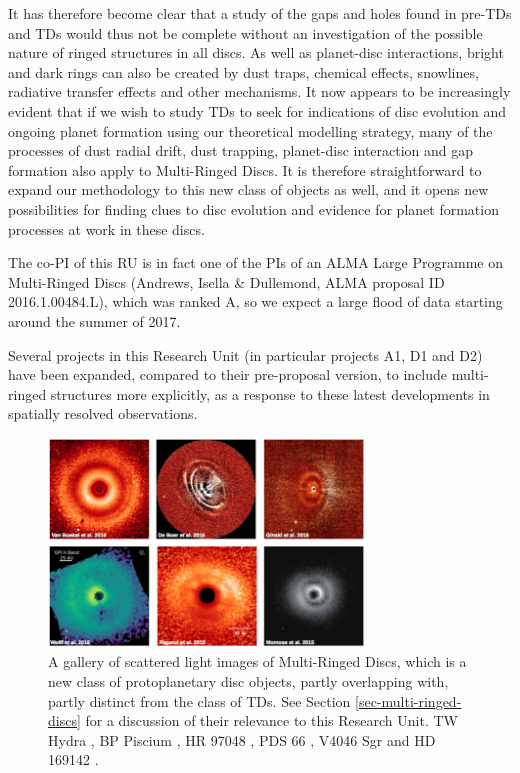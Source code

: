 \documentclass[10pt,fleqn,twoside]{article}
\begin{document}
It has therefore become clear that a study of the gaps and holes found in
pre-TDs and TDs would thus not be complete without an investigation of the
possible nature of ringed structures in all discs. As well as planet-disc
interactions, bright and dark rings can also be created by dust traps,
chemical effects, snowlines, radiative transfer effects and other
mechanisms. It now appears to be increasingly evident that if we wish to
study TDs to seek for indications of disc evolution and ongoing planet
formation using our theoretical modelling strategy, many of the processes of
dust radial drift, dust trapping, planet-disc interaction and gap formation
also apply to Multi-Ringed Discs. It is therefore straightforward to expand
our methodology to this new class of objects as well, and it opens new
possibilities for finding clues to disc evolution and evidence for planet
formation processes at work in these discs.

The co-PI of this RU is in fact one of the PIs of an ALMA Large Programme on
Multi-Ringed Discs (Andrews, Isella \& Dullemond, ALMA proposal ID
2016.1.00484.L), which was ranked A, so we expect a large flood of data
starting around the summer of 2017. 

Several projects in this Research Unit (in particular projects A1, D1 and
D2) have been expanded, compared to their pre-proposal version, to include
multi-ringed structures more explicitly, as a response to these latest
developments in spatially resolved observations.



\begin{figure}
\centerline{\includegraphics[width=0.75\textwidth]{figures/Ringed_Scat.png}}
\caption{\label{fig-ringed-scat} A gallery of scattered light images of
  Multi-Ringed Discs, which is a new class of protoplanetary disc objects,
  partly overlapping with, partly distinct from the class of TDs. See
  Section \ref{sec-multi-ringed-discs} for a discussion of their relevance
  to this Research Unit. 
  TW Hydra \citep{2016arXiv161008939V}, BP Piscium
  \citep{2017MNRAS.466L...7D}, HR 97048 \citep{2016A&A...595A.112G}, PDS 66
  \citep{2016ApJ...818L..15W}, V4046 Sgr \citep{2015ApJ...803L..10R} and HD
  169142 \citep{2015PASJ...67...83M}.}
\end{figure}
\end{document}
